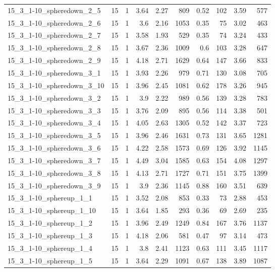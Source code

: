 \begin{center}
\begin{scriptsize}
\begin{longtable}{lrrrrrrrrr}
15\_3\_1-10\_spheredown\_2\_5 & 15 & 1 & 3.64 & 2.27 & 809 & 0.52 & 102 & 3.59 & 577\\
15\_3\_1-10\_spheredown\_2\_6 & 15 & 1 & 3.6 & 2.16 & 1053 & 0.35 & 75 & 3.02 & 463\\
15\_3\_1-10\_spheredown\_2\_7 & 15 & 1 & 3.58 & 1.93 & 529 & 0.35 & 74 & 3.24 & 433\\
15\_3\_1-10\_spheredown\_2\_8 & 15 & 1 & 3.67 & 2.36 & 1009 & 0.6 & 103 & 3.28 & 647\\
15\_3\_1-10\_spheredown\_2\_9 & 15 & 1 & 4.18 & 2.71 & 1629 & 0.64 & 147 & 3.66 & 833\\
15\_3\_1-10\_spheredown\_3\_1 & 15 & 1 & 3.93 & 2.26 & 979 & 0.71 & 130 & 3.08 & 705\\
15\_3\_1-10\_spheredown\_3\_10 & 15 & 1 & 3.96 & 2.45 & 1081 & 0.62 & 178 & 3.26 & 945\\
15\_3\_1-10\_spheredown\_3\_2 & 15 & 1 & 3.9 & 2.22 & 989 & 0.56 & 139 & 3.28 & 783\\
15\_3\_1-10\_spheredown\_3\_3 & 15 & 1 & 3.76 & 2.09 & 895 & 0.56 & 114 & 3.38 & 501\\
15\_3\_1-10\_spheredown\_3\_4 & 15 & 1 & 4.05 & 2.63 & 1305 & 0.52 & 142 & 3.37 & 723\\
15\_3\_1-10\_spheredown\_3\_5 & 15 & 1 & 3.96 & 2.46 & 1631 & 0.73 & 131 & 3.65 & 1281\\
15\_3\_1-10\_spheredown\_3\_6 & 15 & 1 & 4.22 & 2.58 & 1573 & 0.69 & 126 & 3.92 & 1145\\
15\_3\_1-10\_spheredown\_3\_7 & 15 & 1 & 4.49 & 3.04 & 1585 & 0.63 & 154 & 4.08 & 1297\\
15\_3\_1-10\_spheredown\_3\_8 & 15 & 1 & 4.13 & 2.71 & 1727 & 0.71 & 151 & 3.75 & 1399\\
15\_3\_1-10\_spheredown\_3\_9 & 15 & 1 & 3.9 & 2.36 & 1145 & 0.88 & 160 & 3.51 & 639\\
15\_3\_1-10\_sphereup\_1\_1 & 15 & 1 & 3.52 & 2.08 & 853 & 0.33 & 73 & 2.88 & 453\\
15\_3\_1-10\_sphereup\_1\_10 & 15 & 1 & 3.64 & 1.85 & 293 & 0.36 & 69 & 2.69 & 235\\
15\_3\_1-10\_sphereup\_1\_2 & 15 & 1 & 3.96 & 2.49 & 1249 & 0.84 & 167 & 3.76 & 1137\\
15\_3\_1-10\_sphereup\_1\_3 & 15 & 1 & 4.18 & 2.06 & 581 & 0.47 & 97 & 3.14 & 473\\
15\_3\_1-10\_sphereup\_1\_4 & 15 & 1 & 3.8 & 2.41 & 1123 & 0.63 & 111 & 3.45 & 1117\\
15\_3\_1-10\_sphereup\_1\_5 & 15 & 1 & 3.64 & 2.29 & 1091 & 0.67 & 138 & 3.89 & 1087\\

\end{longtable}
\end{scriptsize}
\end{center}
